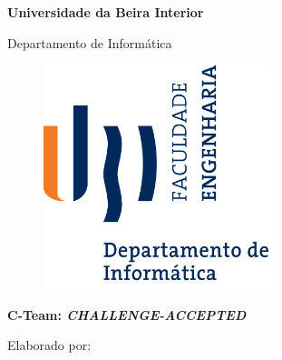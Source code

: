 
\thispagestyle{empty}
\setcounter{page}{-1}

\begin{center}
\begin{Huge}
\textbf{Universidade da Beira Interior}
\end{Huge}
\end{center}

\begin{center}
\begin{Huge}
Departamento de Informática
\end{Huge}
\end{center}

\vspace{0,07cm}
\begin{figure}[!htb]
\centering
\includegraphics[width=191pt]{ubi-fe-di.png}
\end{figure}

\vspace{0.5cm}
\begin{center}
\begin{Large}
\textbf{ C-Team: \emph{CHALLENGE-ACCEPTED}}
\end{Large}
\end{center}


\vspace{0.3cm}
\begin{center}
\begin{normalsize}
\begin{large}
Elaborado por:
\end{large}
\end{normalsize}
\end{center}

